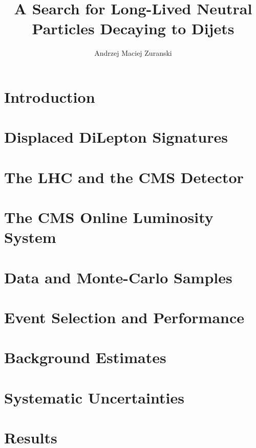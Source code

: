 \documentclass[phd,black]{PrincetonThesis}
\title{A Search for Long-Lived Neutral Particles Decaying to Dijets}
\author{Andrzej Maciej Zuranski}
\begin{document}
\begin{frontmatter}
  \begin{thesisabstract}
    
  \end{thesisabstract}
\end{frontmatter}


\chapter{Introduction}
\chapter{Displaced DiLepton Signatures}
%
%
\chapter{The LHC and the CMS Detector}
\label{chap:cmslhc}
%
%
\chapter{The CMS Online Luminosity System}
\label{chap:lumi}
% 
\chapter{Data and Monte-Carlo Samples}
%
\chapter{Event Selection and Performance}
%
\chapter {Background Estimates}
% 
\chapter{Systematic Uncertainties}
%
\chapter {Results}
%
\end{document}
